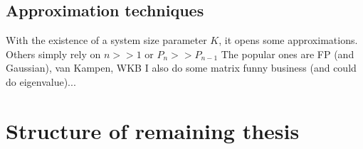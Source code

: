 \documentclass[a4paper,11pt]{article}
\numberwithin{equation}{section} %
\begin{document}


\subsection{Approximation techniques}

With the existence of a system size parameter $K$, it opens some approximations. 
Others simply rely on $n>>1$ or $P_n>>P_{n-1}$
The popular ones are FP (and Gaussian), van Kampen, WKB
I also do some matrix funny business (and could do eigenvalue)...










\section{Structure of remaining thesis}
%
%
%
%
\end{document}
